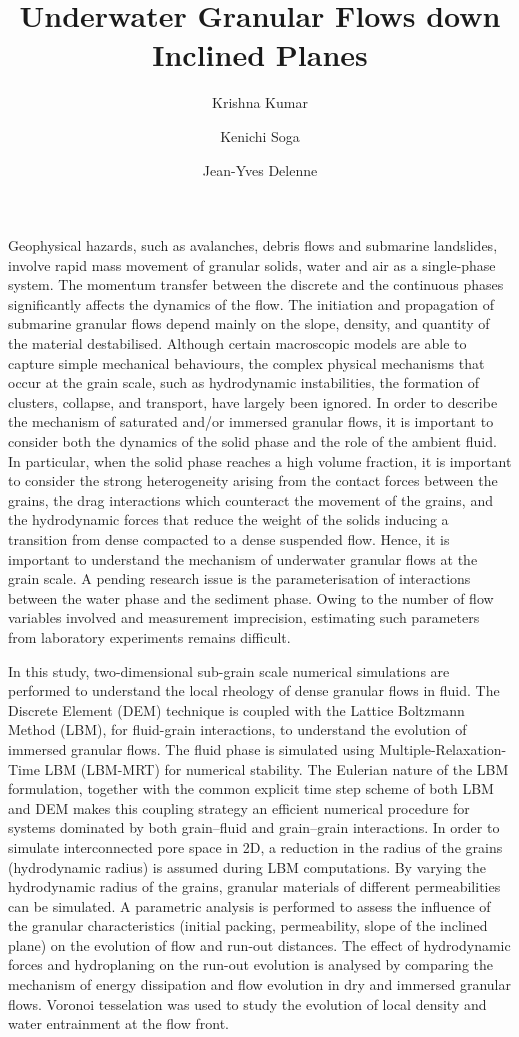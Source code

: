 \documentclass[11pt,a4]{article}
\title{Underwater Granular Flows down Inclined Planes}
\author[1]{Krishna Kumar}
\author[1]{Kenichi Soga}
\author[2]{Jean-Yves Delenne}
\affil[1]{Department of Engineering, University of Cambridge, Cambridge, CB2 1PZ, UK}
\affil[2]{IATE, UMR1208 INRA-CIRAD-Montpellier Supagro-UM2, 2 place Pierre Viala, 34060 Montpellier cedex 01, France}
\date{}
\begin{document}
\maketitle

Geophysical hazards, such as avalanches, debris flows and submarine landslides, involve rapid mass movement of granular solids, water and air as a single-phase system. The momentum transfer between the discrete and the continuous phases significantly affects the dynamics of the flow. The initiation and propagation of submarine granular flows depend mainly on the slope, density, and quantity of the material destabilised. Although certain macroscopic models are able to capture simple mechanical behaviours, the complex physical mechanisms that occur at the grain scale, such as hydrodynamic instabilities, the formation of clusters, collapse, and transport, have largely been ignored. In order to describe the mechanism of saturated and/or immersed granular flows, it is important to consider both the dynamics of the solid phase and the role of the ambient fluid. In particular, when the solid phase reaches a high volume fraction, it is important to consider the strong heterogeneity arising from the contact forces between the grains, the drag interactions which counteract the movement of the grains, and the hydrodynamic forces that reduce the weight of the solids inducing a transition from dense compacted to a dense suspended flow. Hence, it is important to understand the mechanism of underwater granular flows at the grain scale. A pending research issue is the parameterisation of interactions between the water phase and the sediment phase. Owing to the number of flow variables involved and measurement imprecision, estimating such parameters from laboratory experiments remains difficult.

In this study, two-dimensional sub-grain scale numerical simulations are performed to understand the local rheology of dense granular flows in fluid. The Discrete Element (DEM) technique is coupled with the Lattice Boltzmann Method (LBM), for fluid-grain interactions, to understand the evolution of immersed granular flows. The fluid phase is simulated using Multiple-Relaxation-Time LBM (LBM-MRT) for numerical stability. The Eulerian nature of the LBM formulation, together with the common explicit time step scheme of both LBM and DEM makes this coupling strategy an efficient numerical procedure for systems dominated by both grain--fluid and grain--grain interactions. In order to simulate interconnected pore space in 2D, a reduction in the radius of the grains (hydrodynamic radius) is assumed during LBM computations. By varying the hydrodynamic radius of the grains, granular materials of different permeabilities can be simulated. A parametric analysis is performed to assess the influence of the granular characteristics (initial packing, permeability, slope of the inclined plane) on the evolution of flow and run-out distances. The effect of hydrodynamic forces and hydroplaning on the run-out evolution is analysed by comparing the mechanism of energy dissipation and flow evolution in dry and immersed granular flows. Voronoi tesselation was used to study the evolution of local density and water entrainment at the flow front. 
\end{document}
